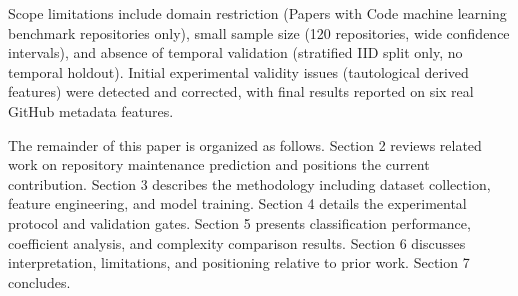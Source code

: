 Scope limitations include domain restriction (Papers with Code machine learning benchmark repositories only), small sample size (120 repositories, wide confidence intervals), and absence of temporal validation (stratified IID split only, no temporal holdout). Initial experimental validity issues (tautological derived features) were detected and corrected, with final results reported on six real GitHub metadata features.

The remainder of this paper is organized as follows. Section 2 reviews related work on repository maintenance prediction and positions the current contribution. Section 3 describes the methodology including dataset collection, feature engineering, and model training. Section 4 details the experimental protocol and validation gates. Section 5 presents classification performance, coefficient analysis, and complexity comparison results. Section 6 discusses interpretation, limitations, and positioning relative to prior work. Section 7 concludes.
